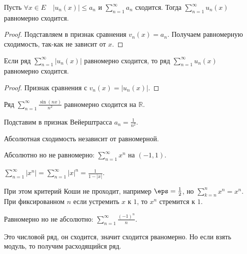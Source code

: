 \begin{theorem} \thmslashn

    Пусть $\forall{x\in E}\quad |u_{n}(x)| \le a_{n}$ и $\sum\limits_{n=1}^{\infty} a_{n}$ сходится. Тогда $\sum\limits_{n=1}^{\infty} u_{n}(x)$ равномерно сходится.
    \begin{proof} \thmslashn
    
        Подставляем в признак сравнения $v_{n}(x) = a_{n}$. Получаем равномерную сходимость, так-как не зависит от $x$.
    \end{proof}
\end{theorem}
\begin{consequence} \thmslashn

    Если ряд $ \sum\limits_{n=1}^{\infty} |u_{n}(x)|$ равномерно сходится, то ряд $\sum\limits_{n=1}^{\infty} u_{n}(x)$ равномерно сходится.
    \begin{proof} \thmslashn
    
        Признак сравнения с $v_{n}(x) = |u_{n}(x)|$.
    \end{proof}
\end{consequence}
\begin{example} \thmslashn

    Ряд $\sum\limits_{n=1}^{\infty} \frac{\sin(nx)}{n^2}$ равномерно сходится на $\mathbb{R}$.

    Подставим в признак Вейерштрасса $a_{n} = \frac{1}{n^2}$.
\end{example}
\begin{remark} \thmslashn

    Абсолютная сходимость независит от равномерной.
\end{remark}
\begin{example} \thmslashn

    Абсолютно но не равномерно: $\sum\limits_{n=1}^{\infty} x^{n}$ на $(-1, 1)$. 
    
    $\sum\limits_{n=1}^{\infty} |x^{n}| = \sum\limits_{n=1}^{\infty} |x|^{n} = \frac{1}{1 - |x|}$. 
    
    При этом критерий Коши не проходит, например $\eps=\frac{1}{2}$, но $\sum\limits_{k=n}^{n} x^{n} = x^{n}$. При фиксированном $n$ если устремить $x$ к $1$, то $x^{n}$ стремится к $1$.
\end{example}
\begin{example} \thmslashn

    Равномерно но не абсолютно: $\sum\limits_{n=1}^{\infty} \frac{(-1)^{n}}{n}$.

    Это числовой ряд, он сходится, значит сходится рваномерно. Но если взять модуль, то получим расходящийся ряд.
\end{example}
